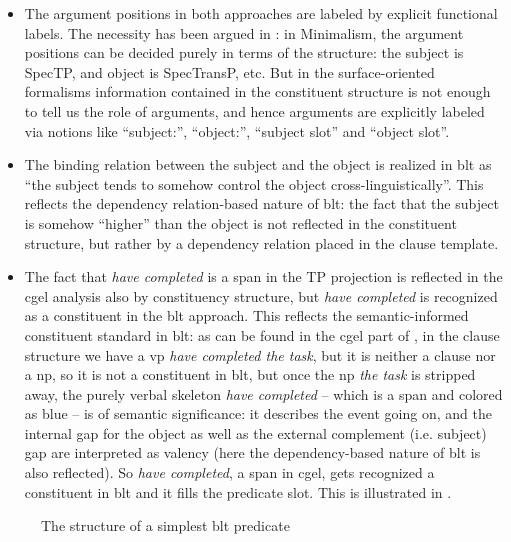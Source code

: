 \documentclass{article}
\newcommand*{\corpus}[1]{\emph{#1}}
\begin{document}
\begin{itemize}
    \item The argument positions in both approaches are labeled by explicit functional labels.
    The necessity has been argued in :
    in Minimalism, the argument positions can be decided purely in terms of the structure:
    the subject is SpecTP, and object is SpecTransP, etc.
    But in the surface-oriented formalisms 
    information contained in the constituent structure
    is not enough to tell us the role of arguments,
    and hence arguments are explicitly labeled via notions like 
    ``subject:'', ``object:'', ``subject slot'' and ``object slot''.
    \item The binding relation between the subject and the object 
    is realized in \ac{blt} as ``the subject tends to somehow control the object cross-linguistically''.
    This reflects the dependency relation-based nature of \ac{blt}:
    the fact that the subject is somehow ``higher'' than the object 
    is not reflected in the constituent structure, 
    but rather by a dependency relation placed in the clause template.
    \item The fact that \corpus{have completed} is a span in the TP projection 
    is reflected in the \ac{cgel} analysis also by constituency structure,
    but \corpus{have completed} is recognized as a constituent in the \ac{blt} approach.
    This reflects the semantic-informed constituent standard in \ac{blt}:
    as can be found in the \ac{cgel} part of ,
    in the clause structure we have a \ac{vp} \corpus{have completed the task},
    but it is neither a clause nor a \ac{np},
    so it is not a constituent in \ac{blt},
    but once the \ac{np} \corpus{the task} is stripped away,
    the purely verbal skeleton \corpus{have completed} -- which is a span and colored as blue --
    is of semantic significance: 
    it describes the event going on, 
    and the internal gap for the object as well as the external complement (i.e. subject) gap 
    are interpreted as valency (here the dependency-based nature of \ac{blt} is also reflected).
    So \corpus{have completed}, a span in \ac{cgel}, gets recognized a constituent in \ac{blt} 
    and it fills the predicate slot.
    This is illustrated in .
\end{itemize}

\begin{figure}
    \centering
    
    \caption{The structure of a simplest \ac{blt} predicate}
    \label{fig:blt-predicate-simple}
\end{figure}
\end{document}
